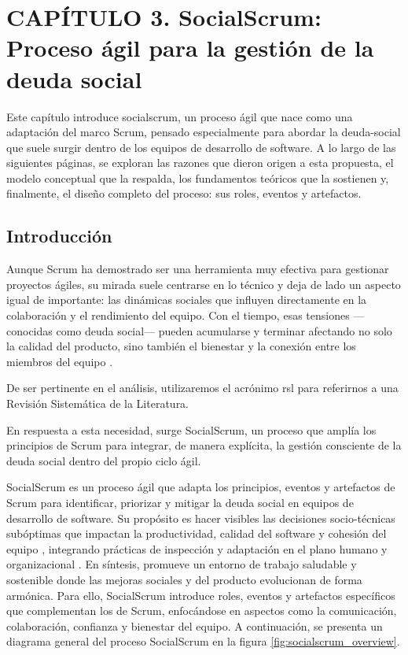 ﻿\chapter*{CAPÍTULO 3. SocialScrum: Proceso ágil para la gestión de la deuda social}
\setcounter{chapter}{3}
\setcounter{section}{0}
\setcounter{subsection}{0}
\setcounter{subsubsection}{0}
\renewcommand{\thesection}{\thechapter.\arabic{section}}
\renewcommand{\thesubsection}{\thesection.\arabic{subsection}}
\renewcommand{\thesubsubsection}{\thesubsection.\arabic{subsubsection}}

Este capítulo introduce \gls{socialscrum}, un proceso ágil que nace como una adaptación del marco Scrum, pensado especialmente para abordar la \gls{deuda-social} que suele surgir dentro de los equipos de desarrollo de software.
A lo largo de las siguientes páginas, se exploran las razones que dieron origen a esta propuesta, el modelo conceptual que la respalda, los fundamentos teóricos que la sostienen y, finalmente, el diseño completo del proceso: sus roles, eventos y artefactos.

\section{Introducción}

Aunque Scrum ha demostrado ser una herramienta muy efectiva para gestionar proyectos ágiles, su mirada suele centrarse en lo técnico y deja de lado un aspecto igual de importante: las dinámicas sociales que influyen directamente en la colaboración y el rendimiento del equipo. Con el tiempo, esas tensiones —conocidas como deuda social— pueden acumularse y terminar afectando no solo la calidad del producto, sino también el bienestar y la conexión entre los miembros del equipo \cite{tamburri2013socialdebt}.

De ser pertinente en el análisis, utilizaremos el acrónimo \acrfull{rsl} para referirnos a una Revisión Sistemática de la Literatura.

En respuesta a esta necesidad, surge SocialScrum, un proceso que amplía los principios de Scrum para integrar, de manera explícita, la gestión consciente de la deuda social dentro del propio ciclo ágil.

SocialScrum es un proceso ágil que adapta los principios, eventos y artefactos de Scrum para identificar, priorizar y mitigar la deuda social en equipos de desarrollo de software. Su propósito es hacer visibles las decisiones socio-técnicas subóptimas que impactan la productividad, calidad del software y cohesión del equipo \cite{tamburri2013socialdebt}, integrando prácticas de inspección y adaptación en el plano humano y organizacional \cite{saeeda2024nontechnicaldebt}. En síntesis, promueve un entorno de trabajo saludable y sostenible donde las mejoras sociales y del producto evolucionan de forma armónica. Para ello, SocialScrum introduce roles, eventos y artefactos específicos que complementan los de Scrum, enfocándose en aspectos como la comunicación, colaboración, confianza y bienestar del equipo. A continuación, se presenta un diagrama general del proceso SocialScrum en la figura \ref{fig:socialscrum_overview}.

